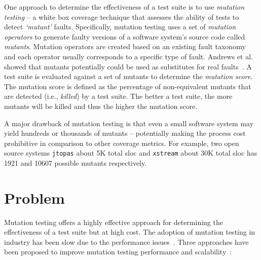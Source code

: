 One approach to determine the effectiveness of a test suite is to use \emph{mutation testing} -- a white box coverage technique that assesses the ability of tests to detect \emph{`mutant'} faults. Specifically, mutation testing uses a set of \emph{mutation operators} to generate faulty versions of a software system's source code called \emph{mutants}. Mutation operators are created based on an existing fault taxonomy and each operator usually corresponds to a specific type of fault. Andrews et al. showed that mutants potentially could be used as substitutes for real faults~\cite{ABLN06}. A test suite is evaluated against a set of mutants to determine the \emph{mutation score}. The mutation score is defined as the percentage of non-equivalent mutants that are detected (i.e., \emph{killed}) by a test suite. The better a test suite, the more mutants will be killed and thus the higher the mutation score.

A major drawback of mutation testing is that even a small software system may yield hundreds or thousands of mutants -- potentially making the process cost prohibitive in comparison to other coverage metrics. For example, two open source systems \texttt{jtopas} about 5K total \gls{sloc} and \texttt{xstream} about 30K total \gls{sloc} has 1921 and 10607 possible mutants respectively\cite{SZ09}.


\section{Problem}
\label{sec:introduction_problem}
Mutation testing offers a highly effective approach for determining the effectiveness of a test suite but at high cost. The adoption of mutation testing in industry has been slow due to the performance issues~\cite{?}. Three approaches have been proposed to improve mutation testing performance and scalability~\cite{OU01}:

